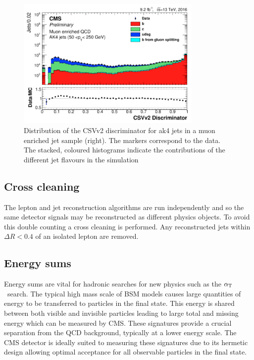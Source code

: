 \begin{figure}
\centering
    \includegraphics[width=0.8\textwidth]{./Figures/reconstruction/csv_fig.png}
  \caption{\label{fig:csv_fig} Distribution of the CSVv2 discriminator for ak4 jets 
in a muon enriched jet sample (right). The markers correspond to the data. 
The stacked, coloured histograms indicate the contributions of the different 
jet flavours in the simulation \cite{csv_fig}}
\end{figure}

\subsection{Cross cleaning}

The lepton and jet reconstruction algorithms are run independently and so the same detector
signals may be reconstructed as different physics objects. To avoid this double counting a cross cleaning
is performed. Any reconstructed jets within $\Delta R < 0.4$ of an isolated lepton are removed.

\subsection{Energy sums}

Energy sums are vital for hadronic searches for new physics such as the $\alpha_{\text{T}}$~search. The typical high
mass scale of BSM models causes large quantities of energy to be transferred to particles in the final
state. This energy is shared between both visible and invisible particles leading to large total and missing energy
which can be measured by CMS. These signatures provide a crucial separation from the QCD background, typically at
a lower energy scale. The CMS detector is ideally suited to measuring these signatures due to its hermetic design
allowing optimal acceptance for all observable particles in the final state.

